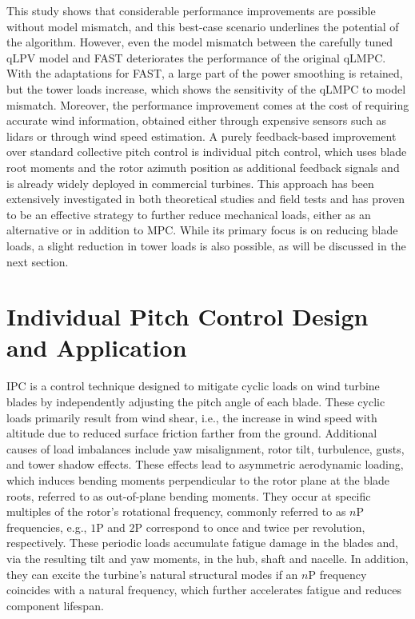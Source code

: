 This study shows that considerable performance improvements are possible without model mismatch, and this best-case scenario underlines the potential of the algorithm. However, even the model mismatch between the carefully tuned qLPV model and FAST deteriorates the performance of the original qLMPC. With the adaptations for FAST, a large part of the power smoothing is retained, but the tower loads increase, which shows the sensitivity of the qLMPC to model mismatch. Moreover, the performance improvement comes at the cost of requiring accurate wind information, obtained either through expensive sensors such as lidars or through wind speed estimation. A purely feedback-based improvement over standard collective pitch control is individual pitch control, which uses blade root moments and the rotor azimuth position as additional feedback signals and is already widely deployed in commercial turbines. This approach has been extensively investigated in both theoretical studies and field tests and has proven to be an effective strategy to further reduce mechanical loads, either as an alternative or in addition to MPC. While its primary focus is on reducing blade loads, a slight reduction in tower loads is also possible, as will be discussed in the next section.

\section{Individual Pitch Control Design and Application}\label{section:Individal Pitch PI Control} 
IPC is a control technique designed to mitigate cyclic loads on wind turbine blades by independently adjusting the pitch angle of each blade. These cyclic loads primarily result from wind shear, i.e., the increase in wind speed with altitude due to reduced surface friction farther from the ground. Additional causes of load imbalances include yaw misalignment, rotor tilt, turbulence, gusts, and tower shadow effects. These effects lead to asymmetric aerodynamic loading, which induces bending moments perpendicular to the rotor plane at the blade roots, referred to as out-of-plane bending moments. They occur at specific multiples of the rotor's rotational frequency, commonly referred to as $n\text{P}$ frequencies, e.g., $1\text{P}$ and $2\text{P}$ correspond to once and twice per revolution, respectively. These periodic loads accumulate fatigue damage in the blades and, via the resulting tilt and yaw moments, in the hub, shaft and nacelle. In addition, they can excite the turbine's natural structural modes if an $n\text{P}$ frequency coincides with a natural frequency, which further accelerates fatigue and reduces component lifespan.


